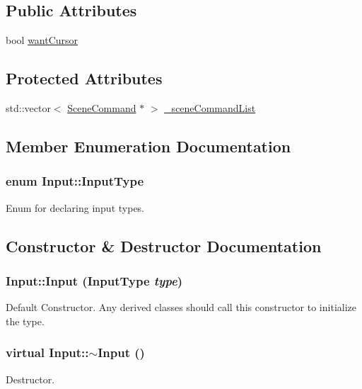 \subsection*{Public Attributes}
\begin{DoxyCompactItemize}
\item 
bool \hyperlink{class_input_a4578b3d751dd43e66e3623e69d0f45fc}{wantCursor}
\end{DoxyCompactItemize}
\subsection*{Protected Attributes}
\begin{DoxyCompactItemize}
\item 
std::vector$<$ \hyperlink{class_scene_command}{SceneCommand} $\ast$ $>$ \hyperlink{class_input_a560f0340c51d4c939c873be86ae8a963}{\_\-sceneCommandList}
\end{DoxyCompactItemize}


\subsection{Member Enumeration Documentation}
\hypertarget{class_input_a5b3edc71e8f4aec47e2f44a492297cab}{
\subsubsection[{InputType}]{\setlength{\rightskip}{0pt plus 5cm}enum {\bf Input::InputType}}}
\label{class_input_a5b3edc71e8f4aec47e2f44a492297cab}
Enum for declaring input types. 

\subsection{Constructor \& Destructor Documentation}
\hypertarget{class_input_a7bdc5c67dff8a595f91ccb10da4cc4c2}{
\subsubsection[{Input}]{\setlength{\rightskip}{0pt plus 5cm}Input::Input ({\bf InputType} {\em type})}}
\label{class_input_a7bdc5c67dff8a595f91ccb10da4cc4c2}
Default Constructor. Any derived classes should call this constructor to initialize the type. \hypertarget{class_input_a230646fa6e6433b4d9ac3535b7d52087}{
\subsubsection[{$\sim$Input}]{\setlength{\rightskip}{0pt plus 5cm}virtual Input::$\sim$Input ()}}
\label{class_input_a230646fa6e6433b4d9ac3535b7d52087}
Destructor. 

